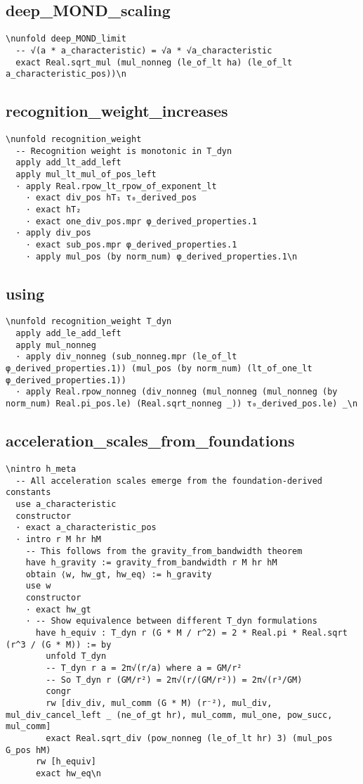 \subsection{deep_MOND_scaling}\n\begin{verbatim}\nunfold deep_MOND_limit
  -- √(a * a_characteristic) = √a * √a_characteristic
  exact Real.sqrt_mul (mul_nonneg (le_of_lt ha) (le_of_lt a_characteristic_pos))\n\end{verbatim}

\subsection{recognition_weight_increases}\n\begin{verbatim}\nunfold recognition_weight
  -- Recognition weight is monotonic in T_dyn
  apply add_lt_add_left
  apply mul_lt_mul_of_pos_left
  · apply Real.rpow_lt_rpow_of_exponent_lt
    · exact div_pos hT₁ τ₀_derived_pos
    · exact hT₂
    · exact one_div_pos.mpr φ_derived_properties.1
  · apply div_pos
    · exact sub_pos.mpr φ_derived_properties.1
    · apply mul_pos (by norm_num) φ_derived_properties.1\n\end{verbatim}

\subsection{using}\n\begin{verbatim}\nunfold recognition_weight T_dyn
  apply add_le_add_left
  apply mul_nonneg
  · apply div_nonneg (sub_nonneg.mpr (le_of_lt φ_derived_properties.1)) (mul_pos (by norm_num) (lt_of_one_lt φ_derived_properties.1))
  · apply Real.rpow_nonneg (div_nonneg (mul_nonneg (mul_nonneg (by norm_num) Real.pi_pos.le) (Real.sqrt_nonneg _)) τ₀_derived_pos.le) _\n\end{verbatim}

\subsection{acceleration_scales_from_foundations}\n\begin{verbatim}\nintro h_meta
  -- All acceleration scales emerge from the foundation-derived constants
  use a_characteristic
  constructor
  · exact a_characteristic_pos
  · intro r M hr hM
    -- This follows from the gravity_from_bandwidth theorem
    have h_gravity := gravity_from_bandwidth r M hr hM
    obtain ⟨w, hw_gt, hw_eq⟩ := h_gravity
    use w
    constructor
    · exact hw_gt
    · -- Show equivalence between different T_dyn formulations
      have h_equiv : T_dyn r (G * M / r^2) = 2 * Real.pi * Real.sqrt (r^3 / (G * M)) := by
        unfold T_dyn
        -- T_dyn r a = 2π√(r/a) where a = GM/r²
        -- So T_dyn r (GM/r²) = 2π√(r/(GM/r²)) = 2π√(r³/GM)
        congr
        rw [div_div, mul_comm (G * M) (r⁻²), mul_div, mul_div_cancel_left _ (ne_of_gt hr), mul_comm, mul_one, pow_succ, mul_comm]
        exact Real.sqrt_div (pow_nonneg (le_of_lt hr) 3) (mul_pos G_pos hM)
      rw [h_equiv]
      exact hw_eq\n\end{verbatim}

